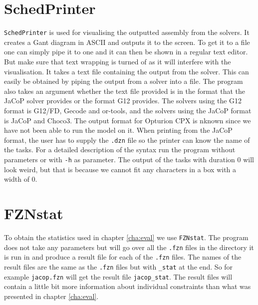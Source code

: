 \section{SchedPrinter}
\texttt{SchedPrinter} is used for visualising the outputted assembly from the solvers. It creates a Gant diagram in ASCII and outputs it to the screen. To get it to a file one can simply pipe it to one and it can then be shown in a regular text editor. But make sure that text wrapping is turned of as it will interfere with the visualisation. It takes a text file containing the output from the solver. This can easily be obtained by piping the output from a solver into a file. The program also takes an argument whether the text file provided is in the format that the JaCoP solver provides or the format G12 provides. The solvers using the G12 format is G12/FD, Gecode and or-tools, and the solvers using the JaCoP format is JaCoP and Choco3. The output format for Opturion CPX is nknown since we have not been able to run the model on it. When printing from the JaCoP format, the user has to supply the \texttt{.dzn} file so the printer can know the name of the tasks. For a detailed description of the syntax run the program without parameters or with \texttt{-h} as parameter. The output of the tasks with duration 0 will look weird, but that is because we cannot fit any characters in a box with a width of 0.

\section{FZNstat}
To obtain the statistics used in chapter \ref{cha:eval} we use \texttt{FZNstat}. The program does not take any parameters but will go over all the \texttt{.fzn} files in the directory it is run in and produce a result file for each of the \texttt{.fzn} files. The names of the result files are the same as the \texttt{.fzn} files but with \texttt{\_stat} at the end. So for example \texttt{jacop.fzn} will get the result file \texttt{jacop\_stat}. The result files will contain a little bit more information about individual constraints than what was presented in chapter \ref{cha:eval}.
